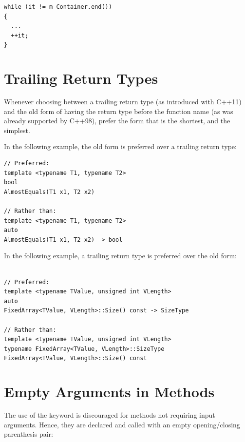 \small
\begin{verbatim}
while (it != m_Container.end())
{
  ...
  ++it;
}
\end{verbatim}
\normalsize


\section{Trailing Return Types}%
\label{sec:TrailingReturnTypes}

Whenever choosing between a trailing return type (as introduced with C++11) and
the old form of having the return type before the function name (as was already
supported by C++98), prefer the form that is the shortest, and the simplest.

In the following example, the old form is preferred over a trailing return type:
\small
\begin{verbatim}
// Preferred:
template <typename T1, typename T2>
bool
AlmostEquals(T1 x1, T2 x2)

// Rather than:
template <typename T1, typename T2>
auto
AlmostEquals(T1 x1, T2 x2) -> bool
\end{verbatim}
\normalsize

In the following example, a trailing return type is preferred over the old form:

\small
\begin{verbatim}

// Preferred:
template <typename TValue, unsigned int VLength>
auto
FixedArray<TValue, VLength>::Size() const -> SizeType

// Rather than:
template <typename TValue, unsigned int VLength>
typename FixedArray<TValue, VLength>::SizeType
FixedArray<TValue, VLength>::Size() const

\end{verbatim}
\normalsize


\section{Empty Arguments in Methods}%
\label{sec:EmptyArgumentInMethods}

The use of the  keyword is discouraged for methods not requiring
input arguments. Hence, they are declared and called with an empty
opening/closing parenthesis pair:

